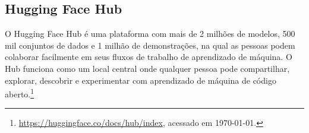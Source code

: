 \subsection{Hugging Face Hub}
O Hugging Face Hub é uma plataforma com mais de 2 milhões de modelos, 500 mil conjuntos de dados e 1 milhão de demonstrações, na qual as pessoas podem colaborar facilmente em seus fluxos de trabalho de aprendizado de máquina. O Hub funciona como um local central onde qualquer pessoa pode compartilhar, explorar, descobrir e experimentar com aprendizado de máquina de código aberto.\footnote{\url{https://huggingface.co/docs/hub/index}, acessado em \today.}